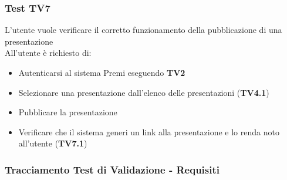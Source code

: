\subsubsection {Test TV7} %

L'utente vuole verificare il corretto funzionamento della pubblicazione di una presentazione\\
All'utente è richiesto di:

\begin{itemize}
	\item Autenticarsi al sistema Premi eseguendo \textbf{TV2}
	\item Selezionare una presentazione dall'elenco delle presentazioni (\textbf{TV4.1})
	\item Pubblicare la presentazione
	\item Verificare che il sistema generi un link alla presentazione e lo renda noto all'utente (\textbf{TV7.1})
\end{itemize}
\newpage
\subsubsection {Tracciamento Test di Validazione - Requisiti}

